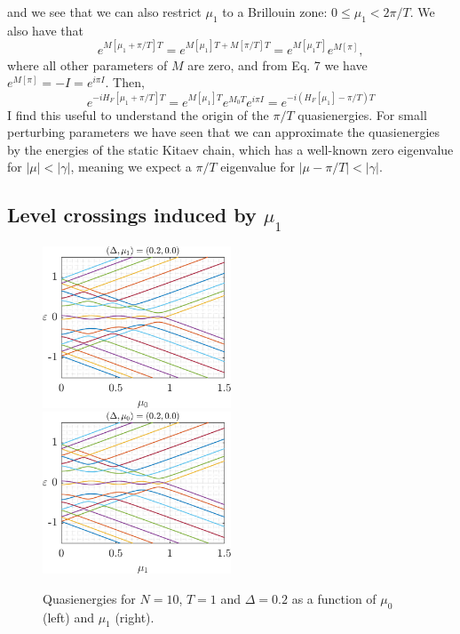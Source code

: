 \documentclass[11pt]{report}
\begin{document}
% 
and we see that we can also restrict $\mu_1$ to a Brillouin zone: $ 0 \leq \mu_1 < 2\pi/T$. We also have that
%
\begin{equation}
e^{M[\mu_1 +\pi/T]T} = e^{M[\mu_1]T+M[\pi/T]T} = e^{M[\mu_1 T]}e^{M[\pi]}, 
\end{equation}
where all other parameters of $M$ are zero, and from Eq. 7 we have $e^{M[\pi]} = -I = e^{i\pi I}$. Then,
%
\begin{equation}
e^{-iH_F[\mu_1+\pi/T]T} = e^{M[\mu_1]T}e^{M_0 T}e^{i\pi I} = e^{-i(H_F[\mu_1]-\pi/T)T}
\end{equation}
% 
I find this useful to understand the origin of the $\pi/T$ quasienergies. For small perturbing parameters we have seen that we can approximate the quasienergies by the energies of the static Kitaev chain, which has a well-known zero eigenvalue for $|\mu| < |\gamma|$, meaning we expect a $\pi/T$ eigenvalue for $|\mu-\pi/T| < |\gamma|$. 

\subsection*{Level crossings induced by $\mu_1$}

\begin{figure}
\includegraphics[width=0.5\textwidth]{Figures/Fig1.png}%
\includegraphics[width=0.5\textwidth]{Figures/Fig2.png}
\caption{Quasienergies for $N=10$, $T=1$ and $\Delta = 0.2$ as a function of $\mu_0$ (left) and $\mu_1$ (right).}
\label{Fig:1}
\end{figure}
\end{document}
